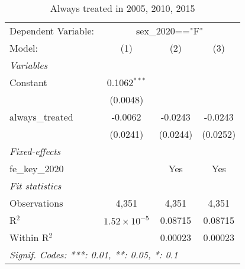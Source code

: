 
\begin{table}[htbp]
   \caption{Always treated in 2005, 2010, 2015}
   \centering
   \begin{tabular}{lccc}
      \tabularnewline \midrule \midrule
      Dependent Variable: & \multicolumn{3}{c}{sex\_2020=="F"}\\
      Model:           & (1)                   & (2)      & (3)\\  
      \midrule
      \emph{Variables}\\
      Constant         & 0.1062$^{***}$        &          &   \\   
                       & (0.0048)              &          &   \\   
      always\_treated  & -0.0062               & -0.0243  & -0.0243\\   
                       & (0.0241)              & (0.0244) & (0.0252)\\   
      \midrule
      \emph{Fixed-effects}\\
      fe\_key\_2020    &                       & Yes      & Yes\\  
      \midrule
      \emph{Fit statistics}\\
      Observations     & 4,351                 & 4,351    & 4,351\\  
      R$^2$            & $1.52\times 10^{-5}$  & 0.08715  & 0.08715\\  
      Within R$^2$     &                       & 0.00023  & 0.00023\\  
      \midrule \midrule
      \multicolumn{4}{l}{\emph{Signif. Codes: ***: 0.01, **: 0.05, *: 0.1}}\\
   \end{tabular}
\end{table}


